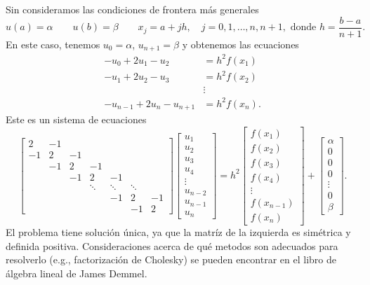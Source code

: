 \documentclass[11pt,letterpaper]{report}
\begin{document}
Sin consideramos las condiciones de frontera más generales
\begin{equation}
  u(a)=\alpha
  \qquad u(b)=\beta
  \qquad x_j = a+jh, \quad j=0,1,\dots,n,n+1,
  \text{ donde } h = \frac{b-a}{n+1}
.\end{equation}
En este caso, tenemos $u_0=\alpha$, $u_{n+1}=\beta$ y obtenemos las
ecuaciones
\begin{align}
  -u_0+2u_1-u_2 &= h^{2}f(x_1) \\
  -u_1+2u_2-u_3 &= h^{2}f(x_2) \\
                &\vdots \nonumber \\
  -u_{n-1}+2u_n-u_{n+1} &= h^{2}f(x_n)
.\end{align}
Este es un sistema de ecuaciones
\begin{equation}
  \begin{bmatrix}
    2 & -1 \\
    -1 & 2 & -1 \\
       & -1 & 2 & -1 \\
       & & -1 & 2 & -1 \\
       &&&\ddots &\ddots &\ddots \\
       &&& & -1 & 2 & -1 \\
       &&&& & -1 & 2
  \end{bmatrix}
  \begin{bmatrix}
    u_1 \\ u_2 \\ u_3 \\ u_4 \\ \vdots \\ u_{n-2} \\ u_{n-1} \\ u_n
  \end{bmatrix}
  =
  h^{2}
  \begin{bmatrix}
    f(x_1) \\ f(x_2) \\ f(x_3) \\ f(x_4) \\
    \vdots \\ f(x_{n-1}) \\ f(x_n)
  \end{bmatrix}
  +
  \begin{bmatrix}
    \alpha \\ 0 \\ 0 \\ 0 \\ \vdots \\ 0 \\ \beta
  \end{bmatrix}
.\end{equation}
El problema tiene solución única, ya que la matríz de la izquierda es
simétrica y definida positiva. Consideraciones acerca de qué metodos
son adecuados para resolverlo (e.g., factorización de Cholesky)
se pueden encontrar en el libro de álgebra lineal de James Demmel.
\end{document}
